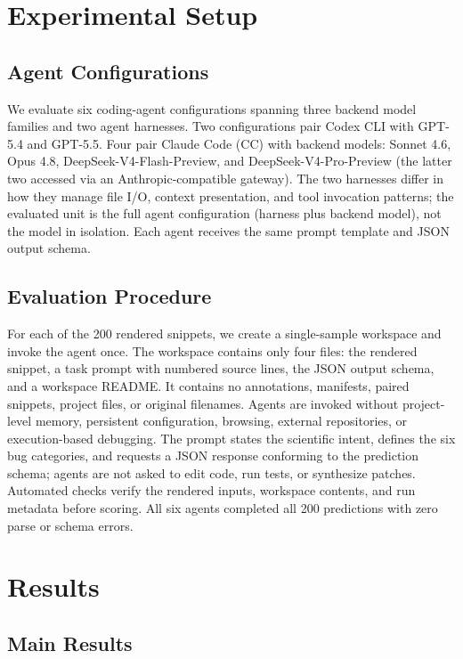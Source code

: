 \documentclass[11pt]{article}
\begin{document}
\section{Experimental Setup}

\subsection{Agent Configurations}

We evaluate six coding-agent configurations spanning three backend model families and two agent harnesses. Two configurations pair Codex CLI with GPT-5.4 and GPT-5.5. Four pair Claude Code (CC) with backend models: Sonnet 4.6, Opus 4.8, DeepSeek-V4-Flash-Preview, and DeepSeek-V4-Pro-Preview (the latter two accessed via an Anthropic-compatible gateway). The two harnesses differ in how they manage file I/O, context presentation, and tool invocation patterns; the evaluated unit is the full agent configuration (harness plus backend model), not the model in isolation. Each agent receives the same prompt template and JSON output schema.

\subsection{Evaluation Procedure}

For each of the 200 rendered snippets, we create a single-sample workspace and invoke the agent once. The workspace contains only four files: the rendered snippet, a task prompt with numbered source lines, the JSON output schema, and a workspace README. It contains no annotations, manifests, paired snippets, project files, or original filenames. Agents are invoked without project-level memory, persistent configuration, browsing, external repositories, or execution-based debugging. The prompt states the scientific intent, defines the six bug categories, and requests a JSON response conforming to the prediction schema; agents are not asked to edit code, run tests, or synthesize patches. Automated checks verify the rendered inputs, workspace contents, and run metadata before scoring. All six agents completed all 200 predictions with zero parse or schema errors.

\section{Results}

\subsection{Main Results}
\end{document}
